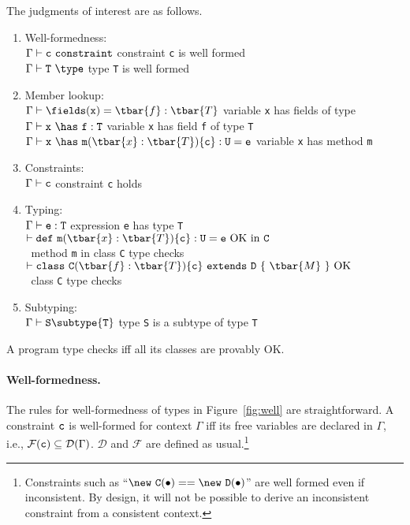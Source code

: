 The judgments of interest are as follows.
\begin{enumerate}
	\item Well-formedness:\\
	  $\cj{\Gamma}{\tt c}$ \hfill constraint {\tt c} is well formed\\
	  $\wj{\Gamma}{\tt T}$ \hfill  type {\tt T} is well formed
	\item Member lookup:\\
	  $\Gamma\vdash \fields({\tt x})=\tbar{f}:\tbar{T}$ \hfill variable {\tt x} has fields  of type \\
	  $\Gamma\vdash {\tt x}~\has~{\tt f}:{\tt T}$ \hfill variable {\tt x} has field {\tt f} of type {\tt T}\\
	  $\Gamma\vdash {\tt x}~\has~{\tt m}(\tbar{x}:\tbar{T})\{{\tt c}\}:{\tt U}={\tt e}$ \hfill variable {\tt x} has method {\tt m}
	\item Constraints:\\
	  $\Gamma\vdash {\tt c}$ \hfill constraint {\tt c} holds
	\item Typing:\\
	  $\Gamma\vdash {\tt e}:{\tt T}$ \hfill expression {\tt e} has type {\tt T}\\
	  $\vdash {\tt def}~{\tt m}(\tbar{x}:\tbar{T})\{{\tt c}\}:{\tt U}={\tt e}~{\rm OK~in}~{\tt C}$ \\ $~$ \hfill method {\tt m} in class {\tt C} type checks\\
	  $\vdash {\tt class}~{\tt C}(\tbar{f}:\tbar{T})\{{\tt c}\}~{\tt extends}~{\tt D}~\{~\tbar{M}~\}~{\rm OK}$ \\ $~$ \hfill class {\tt C} type checks
	\item Subtyping:\\
	  $\Gamma \vdash {\tt S} \subtype {\tt T}$ \hfill type {\tt S} is a subtype of type {\tt T}
\end{enumerate}

A program type checks iff all its classes are provably OK.

\paragraph{Well-formedness.} The rules for well-formedness of
types in Figure~\ref{fig:well} are straightforward. A constraint
$\tt c$ is well-formed for context $\Gamma$ iff its free variables are declared in $\Gamma$, i.e., $\mathcal{F}({\tt c})\subseteq\mathcal{D}(\Gamma)$. $\mathcal{D}$ and $\mathcal{F}$ are defined as usual.\footnote{Constraints such as ``$\new~{\tt C}(\bullet)==\new~{\tt D}(\bullet)$'' are well formed even if inconsistent. By design, it will not be possible to derive an inconsistent constraint from a consistent context.}

